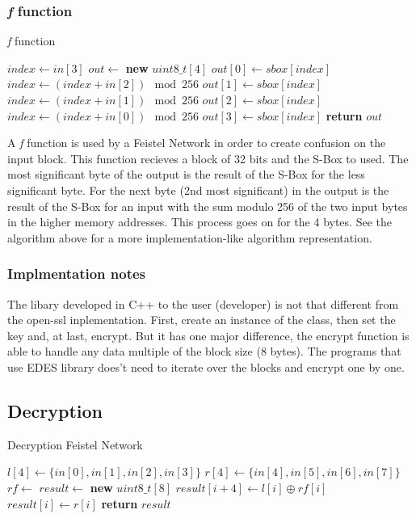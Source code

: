 \documentclass{article} %
\begin{document}
\subsubsection{\textit{f} function}

\begin{algorithm}[H]
  \caption{\textit{f} function}
\begin{algorithmic}[1]
  \State $index \gets in[3]$
  \State $out \gets$ \textbf{new} $uint8\_t[4]$
  \State $out[0] \gets sbox[index]$
  \State $index \gets (index + in[2]) \mod 256$
  \State $out[1] \gets sbox[index]$
  \State $index \gets (index + in[1]) \mod 256$
  \State $out[2] \gets sbox[index]$
  \State $index \gets (index + in[0]) \mod 256$
  \State $out[3] \gets sbox[index]$
  \State \textbf{return} $out$
\end{algorithmic}
\end{algorithm}

A \textit{f} function is used by a Feistel Network in order to create confusion on the input block.
This function recieves a block of 32 bits and the S-Box to used. The most significant byte of the output is 
the result of the S-Box for the less significant byte. For the next byte (2nd most significant) in the 
output is the result of the S-Box for an input with the sum modulo 256 of the two input bytes in the higher memory addresses.
This process goes on for the 4 bytes. See the algorithm above for a more implementation-like algorithm representation.

\subsubsection{Implmentation notes}
The libary developed in C++ to the user (developer) is not that different from the open-ssl inplementation.
First, create an instance of the class, then set the key and, at last, encrypt. But it has one major difference,
the encrypt function is able to handle any data multiple of the block size (8 bytes). 
The programs that use EDES library does't need to iterate over the blocks and encrypt one by one.

\subsection{Decryption}

\begin{algorithm}[H]
  \caption{Decryption Feistel Network}
  \begin{algorithmic}[1]
      \State $l[4] \gets \{in[0], in[1], in[2], in[3]\}$
      \State $r[4] \gets \{in[4], in[5], in[6], in[7]\}$
      \State $rf \gets$ 
      \State $result \gets$ \textbf{new} $uint8\_t[8]$
          \State $result[i + 4] \gets l[i] \oplus rf[i]$
          \State $result[i] \gets r[i]$
      \EndFor
      \State \textbf{return} $result$
  \end{algorithmic}
  \end{algorithm}
\end{document}
